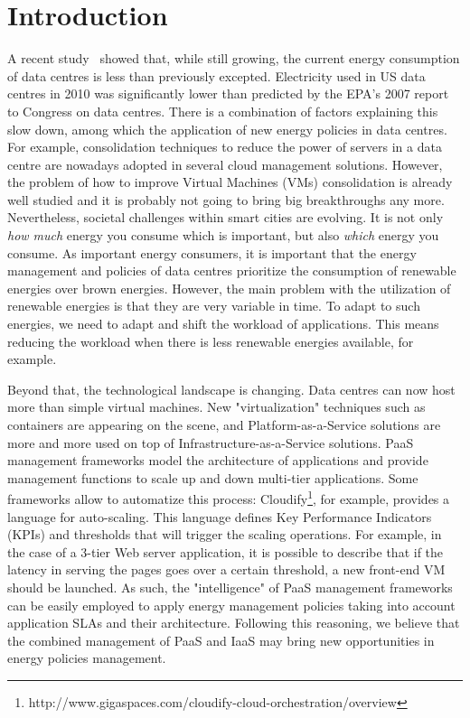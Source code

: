\section{Introduction}
\label{sec: intro}
A recent study~\cite{koomey2011} showed that, while still growing, the current energy consumption of data centres is less than previously excepted.
Electricity used in US data centres in 2010 was significantly lower than predicted by the EPA’s 2007 report to Congress on data centres.
There is a combination of factors explaining this slow down, among which the application of new energy policies in data centres.
For example, consolidation techniques to reduce the power of servers in a data centre are nowadays adopted in several cloud management solutions.
However, the problem of how to improve Virtual Machines (VMs) consolidation is already well studied and it is probably not going to bring big breakthroughs any more.
Nevertheless, societal challenges within smart cities are evolving.
It is not only \emph{how much} energy you consume which is important, but also \emph{which} energy you consume. 
As important energy consumers, it is important that the energy management and policies of data centres prioritize the consumption of renewable energies over brown energies.
However, the main problem with the utilization of renewable energies is that they are very variable in time.
To adapt to such energies, we need to adapt and shift the workload of applications.
This means reducing the workload when there is less renewable energies available, for example.

Beyond that, the technological landscape is changing.
Data centres can now host more than simple virtual machines.
New "virtualization" techniques such as containers are appearing on the scene, and Platform-as-a-Service solutions are more and more used on top of Infrastructure-as-a-Service solutions.
PaaS management frameworks model the architecture of applications and provide management functions to scale up and down multi-tier applications. 
Some frameworks allow to automatize this process: Cloudify\footnote{http://www.gigaspaces.com/cloudify-cloud-orchestration/overview}, for example, provides a language for auto-scaling.
This language defines Key Performance Indicators (KPIs) and thresholds that will trigger the scaling operations.
For example, in the case of a 3-tier Web server application, it is possible to describe that if the latency in serving the pages goes over a certain threshold, a new front-end VM should be launched.
As such, the "intelligence" of PaaS management frameworks can be easily employed to apply energy management policies taking into account application SLAs and their architecture.
Following this reasoning, we believe that the combined management of PaaS and IaaS may bring new opportunities in energy policies management.

